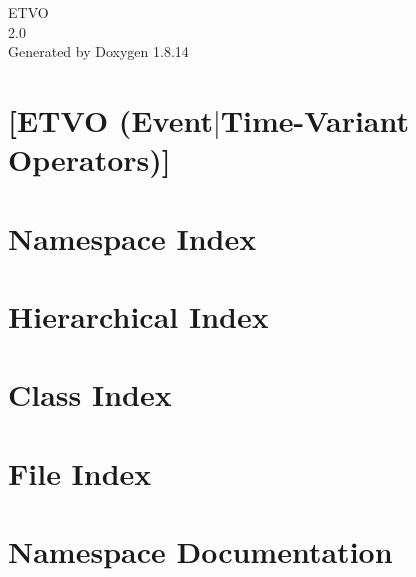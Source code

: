 \documentclass[twoside]{book}
\newcommand{\+}{\discretionary{\mbox{\scriptsize$\hookleftarrow$}}{}{}}
\newcommand{\clearemptydoublepage}{%
  \newpage{\pagestyle{empty}\cleardoublepage}%
}
\begin{document}
\hypersetup{pageanchor=false,
             bookmarksnumbered=true,
             pdfencoding=unicode
            }
\begin{titlepage}
\vspace*{7cm}
\begin{center}%
{\Large E\+T\+VO \\[1ex]\large 2.\+0 }\\
\vspace*{1cm}
{\large Generated by Doxygen 1.8.14}\\
\end{center}
\end{titlepage}
\clearemptydoublepage
{}
\tableofcontents
\clearemptydoublepage
{}
\hypersetup{pageanchor=true}

\chapter{\mbox{[}E\+T\+VO (Event$\vert$\+Time-\/\+Variant Operators)\mbox{]}}
\label{index}\hypertarget{index}{}
\chapter{Namespace Index}

\chapter{Hierarchical Index}

\chapter{Class Index}

\chapter{File Index}

\chapter{Namespace Documentation}

\end{document}
